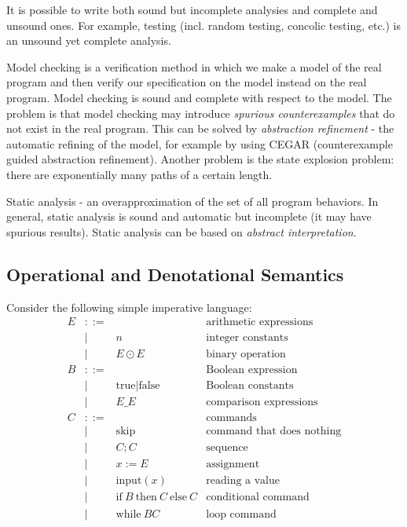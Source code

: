 It is possible to write both sound but incomplete analysies and complete and unsound ones.
For example, testing (incl. random testing, concolic testing, etc.) is an unsound yet
complete analysis. 

Model checking is a verification method in which we make a model of the real program
and then verify our specification on the model instead on the real program. 
Model checking is sound and complete with respect to the model.
The problem is that model checking may introduce \emph{spurious counterexamples}
that do not exist in the real program. This can be solved by \emph{abstraction refinement} -
the automatic refining of the model, for example by using CEGAR (counterexample guided abstraction
refinement). Another problem is the state explosion problem: there are exponentially many paths
of a certain length.

Static analysis - an overapproximation of the set of all program behaviors. In general,
static analysis is sound and automatic but incomplete (it may have spurious results).
Static analysis can be based on \emph{abstract interpretation}.

\subsection{Operational and Denotational Semantics}
Consider the following simple imperative language:
\[
\begin{array}{rcll}
E & ::= & & \text{arithmetic expressions} \\
& | & n & \text{integer constants} \\
& | & E \odot E & \text{binary operation} \\
B & ::= & & \text{Boolean expression} \\
& | & \mathrm{true} | \mathrm{false} & \text{Boolean constants} \\
& | & E \_ E & \text{comparison expressions} \\
C & ::= && \text{commands} \\
& | & \mathrm{skip} & \text{command that does nothing} \\
& | & C ; C & \text{sequence} \\
& | & x := E & \text{assignment} \\
& | & \mathrm{input}(x) & \text{reading a value} \\
& | & \mathrm{if~} B \mathrm{~then~} C \mathrm{~else~} C & \text{conditional command} \\
& | & \mathrm{while~} B C & \text{loop command}
\end{array}
\]

